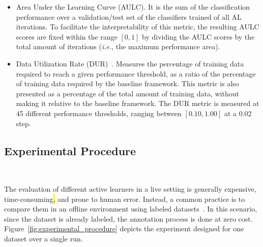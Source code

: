 \documentclass[preprint, 12pt]{elsarticle}
\begin{document}
\begin{itemize}

    \item Area Under the Learning Curve (AULC). It is the sum of the
        classification performance over a validation/test set of the
        classifiers trained of all AL iterations. To facilitate the
        interpretability of this metric, the resulting AULC scores are fixed
        within the range $[0, 1]$ by dividing the AULC scores by the total
        amount of iterations (\textit{i.e.}, the maximum performance area).

    \item Data Utilization Rate (DUR)~\cite{Reitmaier2013}. Measures the
        percentage of training data required to reach a given performance
        threshold, as a ratio of the percentage of training data required by
        the baseline framework. This metric is also presented as a percentage
        of the total amount of training data, without making it relative to
        the baseline framework. The DUR metric is measured at 45 different
        performance thresholds, ranging between $[0.10, 1.00]$ at a 0.02 step.

\end{itemize}
 
\subsection{Experimental Procedure}~\label{sec:experimental_procedure}

The evaluation of different active learners in a live setting is generally
expensive, time-consuming\hl{,} and prone to human error. Instead, a common
practice is to compare them in an offline environment using labeled
datasets~\cite{Kagy2019}. In this scenario, since the dataset is already
labeled, the annotation process is done at zero cost.
Figure~\ref{fig:experimental_procedure} depicts the experiment designed for
one dataset over a single run. 
 
\end{document}
